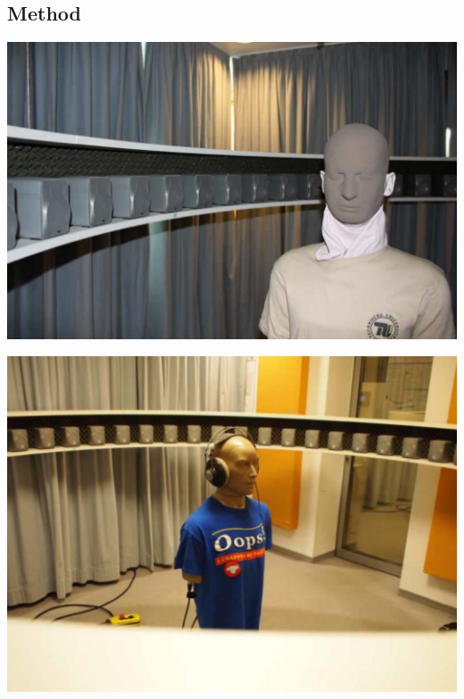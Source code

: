 \subsection{Method}
%
\begin{marginfigure}
    \includegraphics[width=\columnwidth]{fig4_07/fig4_07}
    \caption{Recording of \acp{HRTF} with {\ft FABIAN} in room \emph{Pinta}. Note that this
    picture is from a recording session where {\ft FABIAN} was placed out of the center
    and did not wear headphones.
    }
    \label{fig:pinta_recordings_setup}
\end{marginfigure}
%
\begin{marginfigure}
    \includegraphics[width=\columnwidth]{fig4_08/fig4_08}
    \caption{Recording of the ear signals for binaural synthesis and real loudspeakers in
    room \emph{Pinta}.
    }
    \label{fig:pinta_recordings_setup}
\end{marginfigure}
